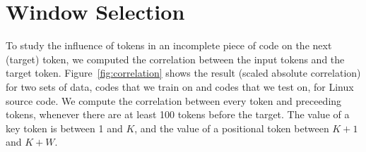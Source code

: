 \section{Window Selection}
\label{sec:window}

\noindent
To study the influence of tokens in an incomplete piece of code on the next
(target) token, we computed the correlation between the input tokens and the
target token.
Figure~\ref{fig:correlation} shows the result (scaled absolute correlation) for
two sets of data, codes that we train on and codes that we test on, for Linux
source code.
We compute the correlation between every token and preceeding tokens, whenever
there are at least 100 tokens before the target.
The value of a key token is between 1 and $K$, and the value of a positional
token between $K+1$ and $K+W$.

